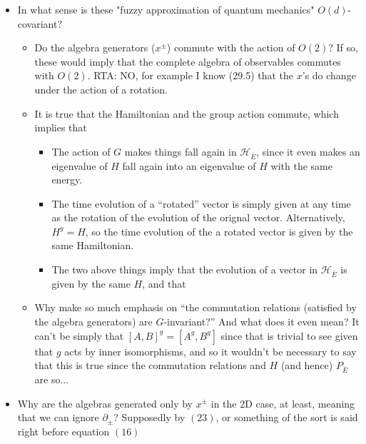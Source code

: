 \documentclass{article}
\newcommand{\cut}[1]{\overline{#1}}
\begin{document}
    \begin{itemize}

    \item In what sense is these "fuzzy approximation of quantum mechanics" $O(d)$-covariant?
    
        \begin{itemize}
            
        \item Do the algebra generators ($x^\pm$) commute with the action of $O(2)$? If so, these would imply that the complete algebra of observables commutes with $O(2)$. RTA: NO, for example I know (29.5) that the $x$'s do change under the action of a rotation.
        
        \item {} It is true that the Hamiltonian and the group action commute, which implies that
        
            \begin{itemize}
                
            \item The action of $G$ makes things fall again in $\mathcal H_{\cut E}$, since it even makes an eigenvalue of $H$ fall again into an eigenvalue of $H$ with the same energy.
            
            \item The time evolution of a ``rotated'' vector is simply given at any time as the rotation of the evolution of the orignal vector. Alternatively, $H^g = H$, so the time evolution of the a rotated vector is given by the same Hamiltonian.
            
            \item The two above things imply that the evolution of a vector in $\mathcal H_{\cut E}$ is given by the same $H$, and that 
            
                
            \end{itemize}
            
        \item Why make so much emphasis on ``the commutation relations (satisfied by the algebra generators) are $G$-invariant?'' And what does it even mean? {\tiny It can't be simply that $[A, B]^g = [A^g, B^g]$ since that is trivial to see given that $g$ acts by inner isomorphisms, and so it wouldn't be necessary to say that this is true since the commutation relations and $H$ (and hence) $P_{\cut E}$ are so... 
        }  
        
        \end{itemize}
    
    \item Why are the algebras generated only by $x^\pm$ in the $2$D case, at least, meaning that we can ignore $\partial_\pm$? {\tiny Supposedly by $(23)$, or something of the sort is said right before equation $(16)$}
    
    
    \end{itemize}
\end{document}
